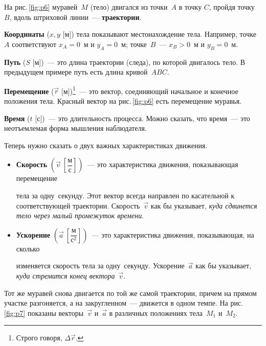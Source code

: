 \documentclass[main.tex]{subfiles}
\begin{document}

%     



На рис.\,\ref{fig:p6} муравей~$M$ (тело) двигался из точки~$A$ в точку $C$, пройдя точку~$B$, вдоль штриховой линии~--- \textbf{траектории}.

\textbf{Координаты} ($x,y$ [м]) тела показывают местонахождение тела. Например, точке~$A$ соответствуют $x_A=0$~м и $y_A=0$~м; точке~$B$~--- $x_B>0$~м и $y_B=0$~м.

\textbf{Путь} ($S$ [м])~--- это длина траектории (следа), по которой двигалось тело. В предыдущем примере путь есть длина кривой~$ABC$. 

\textbf{Перемещение} ($\vec r$ [м])\footnote{Строго говоря, $\Delta \vec r$.}~--- это вектор, соединяющий начальное и конечное положения тела. Красный вектор
на рис.\,\ref{fig:p6} есть перемещение муравья.

\textbf{Время} ($t$ [с])~--- это длительность процесса. Можно сказать, что время~--- это неотъемлемая форма мышления наблюдателя.

Теперь нужно сказать о двух  важных характеристиках движения.
\begin{itemize}
    \item \textbf{Скорость} $\left(\vec v\ \left[\dfrac{\text{м}}{\text{с}}\right]\right)$~--- это характеристика движения, показывающая перемещение \strut тела за одну~секунду. Этот вектор всегда направлен по касательной к соответствующей траектории. Скорость~$\vec v$ как бы указывает, \emph{куда сдвинется тело через малый промежуток времени}.
    \item \textbf{Ускорение} $\left(\vec a\ \left[\dfrac{\text{м}}{\text{с}^2}\right]\right)$~--- это характеристика движения, показывающая, на сколько \strut изменяется скорость тела за одну~секунду. Ускорение~$\vec a$ как бы указывает, \emph{куда стремится конец вектора}~$\vec v$.
\end{itemize}

Тот же муравей снова двигается по той же самой траектории, причем на прямом участке разгоняется, а на закругленном~--- движется в одном темпе. На рис.\,\ref{fig:p7} показаны векторы~$\vec v$ и~$\vec a$ в различных положениях тела~$M_1$ и~$M_2$. 
\end{document}
